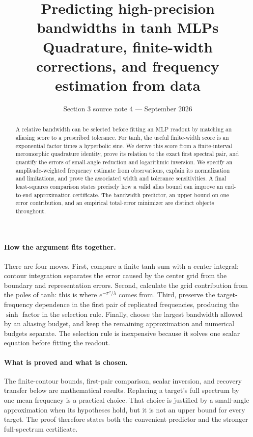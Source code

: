 \documentclass[11pt]{article}
\title{Predicting high-precision bandwidths in tanh MLPs\\[4pt]
\large Quadrature, finite-width corrections, and frequency estimation from data}
\author{}\date{Section 3 source note 4 \;---\; 25 September 2026}
\theoremstyle{definition}\newtheorem{definition}[theorem]{Definition}
\theoremstyle{remark}\newtheorem{remark}[theorem]{Remark}
\numberwithin{equation}{section}
\begin{document}
\maketitle
\begin{abstract}
A relative bandwidth can be selected before fitting an MLP readout by matching an aliasing score to a prescribed tolerance. For tanh, the useful finite-width score is an exponential factor times a hyperbolic sine. We derive this score from a finite-interval meromorphic quadrature identity, prove its relation to the exact first spectral pair, and quantify the errors of small-angle reduction and logarithmic inversion. We specify an amplitude-weighted frequency estimate from observations, explain its normalization and limitations, and prove the associated width and tolerance sensitivities. A final least-squares comparison states precisely how a valid alias bound can improve an end-to-end approximation certificate. The bandwidth predictor, an upper bound on one error contribution, and an empirical total-error minimizer are distinct objects throughout.
\end{abstract}


\paragraph{How the argument fits together.}
There are four moves. First, compare a finite tanh sum with a center integral; contour integration separates the error caused by the center grid from the boundary and representation errors. Second, calculate the grid contribution from the poles of tanh: this is where $e^{-\pi^2/\lambda}$ comes from. Third, preserve the target-frequency dependence in the first pair of replicated frequencies, producing the $\sinh$ factor in the selection rule. Finally, choose the largest bandwidth allowed by an aliasing budget, and keep the remaining approximation and numerical budgets separate. The selection rule is inexpensive because it solves one scalar equation before fitting the readout.

\paragraph{What is proved and what is chosen.}
The finite-contour bounds, first-pair comparison, scalar inversion, and recovery transfer below are mathematical results. Replacing a target's full spectrum by one mean frequency is a practical choice. That choice is justified by a small-angle approximation when its hypotheses hold, but it is not an upper bound for every target. The proof therefore states both the convenient predictor and the stronger full-spectrum certificate.
\end{document}
